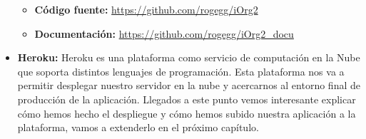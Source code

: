 \begin{itemize}
  \begin{itemize}
    \item \textbf{Código fuente: }\href{https://github.com/rogegg/iOrg2}{https://github.com/rogegg/iOrg2} 
    \item \textbf{Documentación: }\href{https://github.com/rogegg/iOrg2_docu}{https://github.com/rogegg/iOrg2_docu} 
  \end{itemize}

  \item \textbf{Heroku:}
  \bigskip
  Heroku es una plataforma como servicio de computación en la Nube que soporta distintos lenguajes de programación. Esta plataforma nos va a permitir desplegar nuestro servidor en la nube y acercarnos al entorno final de producción de la aplicación. Llegados a este punto vemos interesante explicar cómo hemos hecho el despliegue y cómo hemos subido nuestra aplicación a la plataforma, vamos a extenderlo en el próximo capítulo.

\end{itemize}